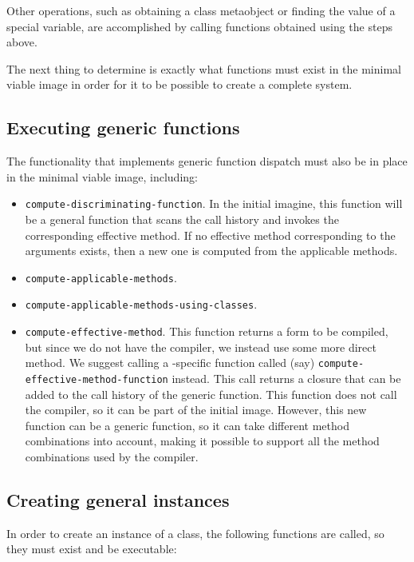 Other operations, such as obtaining a class metaobject or finding the
value of a special variable, are accomplished by calling functions
obtained using the steps above.

The next thing to determine is exactly what functions must exist in
the minimal viable image in order for it to be possible to create a
complete \commonlisp{} system.

\subsection{Executing generic functions}
\label{sec-bootstrapping-executing-generic-functions}

The functionality that implements generic function dispatch must also
be in place in the minimal viable image, including:

\begin{itemize}
\item \texttt{compute-discriminating-function}.  In the initial
  imagine, this function will be a general function that scans the
  call history and invokes the corresponding effective method.  If no
  effective method corresponding to the arguments exists, then a new
  one is computed from the applicable methods.
\item \texttt{compute-applicable-methods}.
\item \texttt{compute-applicable-methods-using-classes}.
\item \texttt{compute-effective-method}.  This function returns a form
  to be compiled, but since we do not have the compiler, we instead
  use some more direct method.  We suggest calling a
  \sysname{}-specific function called (say)
  \texttt{compute-effective-method-function} instead.  This call
  returns a closure that can be added to the call history of the
  generic function.  This function does not call the compiler, so it
  can be part of the initial image.  However, this new function can be
  a generic function, so it can take different method combinations
  into account, making it possible to support all the method
  combinations used by the compiler.
\end{itemize}

\subsection{Creating general instances}
\label{sec-bootstrapping-creating-general-instances}

In order to create an instance of a class, the following functions
are called, so they must exist and be executable:

